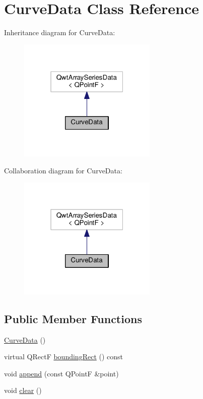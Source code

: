 \hypertarget{classCurveData}{}\section{Curve\+Data Class Reference}
\label{classCurveData}


Inheritance diagram for Curve\+Data\+:\nopagebreak
\begin{figure}[H]
\begin{center}
\leavevmode
\includegraphics[width=187pt]{classCurveData__inherit__graph}
\end{center}
\end{figure}


Collaboration diagram for Curve\+Data\+:\nopagebreak
\begin{figure}[H]
\begin{center}
\leavevmode
\includegraphics[width=187pt]{classCurveData__coll__graph}
\end{center}
\end{figure}
\subsection*{Public Member Functions}
\begin{DoxyCompactItemize}
\item 
\hyperlink{classCurveData_a4e9a1bb778f0cb2e7d573b88163cfd38}{Curve\+Data} ()
\item 
virtual Q\+RectF \hyperlink{classCurveData_ab915e8d2a5f879804584908a65c5c7f6}{bounding\+Rect} () const 
\item 
void \hyperlink{classCurveData_aff1e348b77d682b9ea65e7724d5679d5}{append} (const Q\+PointF \&point)
\item 
void \hyperlink{classCurveData_ae898810872a274a681ab60131ecf922b}{clear} ()
\end{DoxyCompactItemize}


